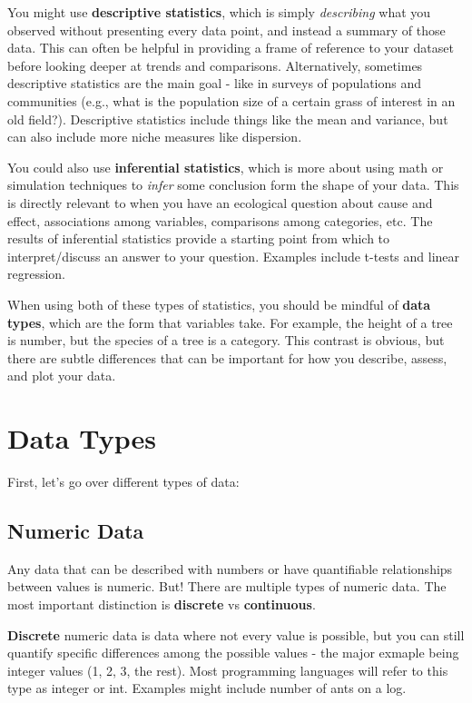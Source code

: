 \documentclass[
  letterpaper,
  DIV=11,
  numbers=noendperiod]{scrreprt}
\begin{document}
You might use \textbf{descriptive statistics}, which is simply
\emph{describing} what you observed without presenting every data point,
and instead a summary of those data. This can often be helpful in
providing a frame of reference to your dataset before looking deeper at
trends and comparisons. Alternatively, sometimes descriptive statistics
are the main goal - like in surveys of populations and communities
(e.g., what is the population size of a certain grass of interest in an
old field?). Descriptive statistics include things like the mean and
variance, but can also include more niche measures like dispersion.

You could also use \textbf{inferential statistics}, which is more about
using math or simulation techniques to \emph{infer} some conclusion form
the shape of your data. This is directly relevant to when you have an
ecological question about cause and effect, associations among
variables, comparisons among categories, etc. The results of inferential
statistics provide a starting point from which to interpret/discuss an
answer to your question. Examples include t-tests and linear regression.

When using both of these types of statistics, you should be mindful of
\textbf{data types}, which are the form that variables take. For
example, the height of a tree is number, but the species of a tree is a
category. This contrast is obvious, but there are subtle differences
that can be important for how you describe, assess, and plot your data.

\hypertarget{data-types}{%
\chapter{Data Types}\label{data-types}}

First, let's go over different types of data:

\hypertarget{numeric-data}{%
\section{Numeric Data}\label{numeric-data}}

Any data that can be described with numbers or have quantifiable
relationships between values is numeric. But! There are multiple types
of numeric data. The most important distinction is \textbf{discrete} vs
\textbf{continuous}.

\textbf{Discrete} numeric data is data where not every value is
possible, but you can still quantify specific differences among the
possible values - the major exmaple being integer values (1, 2, 3, the
rest). Most programming languages will refer to this type as integer or
int. Examples might include number of ants on a log.
\end{document}
